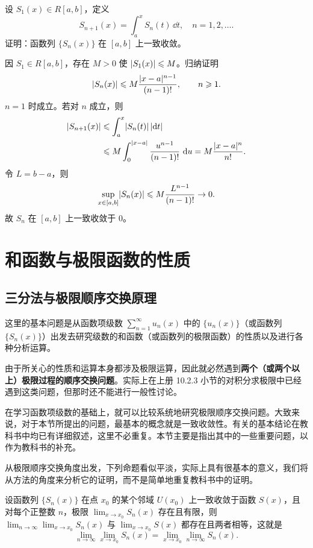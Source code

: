 \begin{xexercise}[14]
设 $S_1(x)\in R[a,b]$，定义
  \[
    S_{n+1}(x)=\int_a^x S_n(t)\,\dd t,\quad n=1,2,\ldots.
  \]
  证明：函数列 $\{S_n(x)\}$ 在 $[a,b]$ 上一致收敛。
\end{xexercise}
\begin{xsolution}
因 $S_1\in R[a,b]$，存在 $M>0$ 使 $\lvert S_1(x)\rvert\leqslant M$。归纳证明
\[
  \lvert S_n(x)\rvert\leqslant M\frac{\lvert x-a\rvert^{n-1}}{(n-1)!},
  \qquad n\geqslant1.
\]
$n=1$ 时成立。若对 $n$ 成立，则
\[
\begin{aligned}
  \lvert S_{n+1}(x)\rvert
  &\leqslant\int_a^x\lvert S_n(t)\rvert\,\lvert\mathop{}\!\mathrm{d} t\rvert\\
  &\leqslant M\int_0^{\lvert x-a\rvert}\frac{u^{n-1}}{(n-1)!}\,\mathop{}\!\mathrm{d} u
  =M\frac{\lvert x-a\rvert^n}{n!}.
\end{aligned}
\]
令 $L=b-a$，则
\[
  \sup_{x\in[a,b]}\lvert S_n(x)\rvert
  \leqslant M\frac{L^{n-1}}{(n-1)!}\to0.
\]
故 $S_n$ 在 $[a,b]$ 上一致收敛于 $0$。
\end{xsolution}


\section{和函数与极限函数的性质}

\subsection{三分法与极限顺序交换原理}

这里的基本问题是从函数项级数 $\displaystyle\sum_{n=1}^{\infty}u_n(x)$ 中的 $\{u_n(x)\}$（或函数列 $\{S_n(x)\}$）出发去研究级数的和函数（或函数列的极限函数）的性质以及进行各种分析运算。

由于所关心的性质和运算本身都涉及极限运算，因此就必然遇到\textbf{两个（或两个以上）极限过程的顺序交换问题}。实际上在上册 10.2.3 小节的对积分求极限中已经遇到这类问题，但那时还不能进行一般性讨论。

在学习函数项级数的基础上，就可以比较系统地研究极限顺序交换问题。大致来说，对于本节所提出的问题，最基本的概念就是一致收敛性。有关的基本结论在教科书中均已有详细叙述，这里不必重复。本节主要是指出其中的一些重要问题，以作为教科书的补充。

从极限顺序交换角度出发，下列命题看似平淡，实际上具有很基本的意义，我们将从方法的角度来分析它的证明，而不是简单地重复教科书中的证明。

\begin{xproposition}[14.2.1]
设函数列 $\{S_n(x)\}$ 在点 $x_0$ 的某个邻域 $U(x_0)$ 上一致收敛于函数 $S(x)$，且对每个正整数 $n$，极限 $\displaystyle\lim_{x\to x_0}S_n(x)$ 存在且有限，则 $\displaystyle\lim_{n\to\infty}\lim_{x\to x_0}S_n(x)$ 与 $\displaystyle\lim_{x\to x_0}S(x)$ 都存在且两者相等，这就是
\begin{equation}
  \lim_{n\to\infty}\lim_{x\to x_0}S_n(x)=\lim_{x\to x_0}\lim_{n\to\infty}S_n(x).
  \tag{14.3}
  \label{eq:14.3}
\end{equation}
\end{xproposition}


